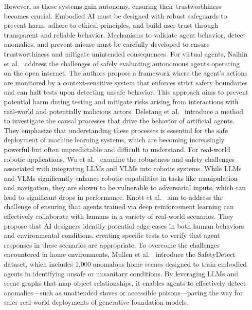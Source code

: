 However, as these systems gain autonomy, ensuring their trustworthiness~\cite{Naihin2023TestingLM, Deletang2021CausalAO, wu2024safety, 10.5555/3463952.3464159, Mullen2024DontFT} becomes crucial. Embodied AI must be designed with robust safeguards to prevent harm, adhere to ethical principles, and build user trust through transparent and reliable behavior. Mechanisms to validate agent behavior, detect anomalies, and prevent misuse must be carefully developed to ensure trustworthiness and mitigate unintended consequences. 
For virtual agents, Naihin et al.~\cite{Naihin2023TestingLM} address the challenges of safely evaluating autonomous agents operating on the open internet. The authors propose a framework where the agent's actions are monitored by a context-sensitive system that enforces strict safety boundaries and can halt tests upon detecting unsafe behavior. This approach aims to prevent potential harm during testing and mitigate risks arising from interactions with real-world and potentially malicious actors. 
Deletang et al.~\cite{Deletang2021CausalAO} introduce a method to investigate the causal processes that drive the behavior of artificial agents. They emphasize that understanding these processes is essential for the safe deployment of machine learning systems, which are becoming increasingly powerful but often unpredictable and difficult to understand.
For real-world robotic applications, Wu et al.~\cite{wu2024safety} examine the robustness and safety challenges associated with integrating LLMs and VLMs into robotic systems. While LLMs and VLMs significantly enhance robotic capabilities in tasks like manipulation and navigation, they are shown to be vulnerable to adversarial inputs, which can lead to significant drops in performance.
Knott et al.~\cite{10.5555/3463952.3464159} aim to address the challenge of ensuring that agents trained via deep reinforcement learning can effectively collaborate with humans in a variety of real-world scenarios. They propose that AI designers identify potential edge cases in both human behaviors and environmental conditions, creating specific tests to verify that agent responses in these scenarios are appropriate.
To overcome the challenges encountered in home environments, Mullen et al.~\cite{Mullen2024DontFT} introduce the SafetyDetect dataset, which includes 1,000 anomalous home scenes designed to train embodied agents in identifying unsafe or unsanitary conditions. By leveraging LLMs and scene graphs that map object relationships, it enables agents to effectively detect anomalies—such as unattended stoves or accessible poisons—paving the way for safer real-world deployments of generative foundation models.

